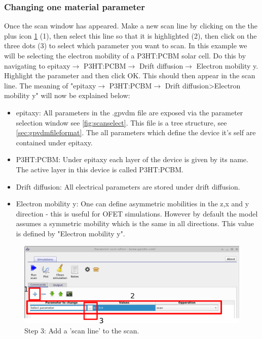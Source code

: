 \subsubsection{Changing one material parameter}

Once the scan window has appeared. Make a new scan line by clicking on the the plus icon \ref{fig:newscanline} (1), then select this line so that it is highlighted (2), then click on the three dots (3) to select which parameter you want to scan. In this example we will be selecting the electron mobility of a P3HT:PCBM solar cell. Do this by navigating to epitaxy$\rightarrow$ P3HT:PCBM$\rightarrow$ Drift diffusion$\rightarrow$ Electron mobility y. Highlight the parameter and then click OK. This should then appear in the scan line. The meaning of "epitaxy$\rightarrow$ P3HT:PCBM$\rightarrow$ Drift diffusion>Electron mobility y" will now be explained below:

\begin{itemize}
  \item epitaxy: All parameters in the .gpvdm file are exposed via the parameter selection window see \ref{fig:scanselect}. This file is a tree structure, see \ref{sec:gpvdmfileformat}. The all parameters which define the device it's self are contained under epitaxy.
  \item P3HT:PCBM: Under epitaxy each layer of the device is given by its name. The active layer in this device is called P3HT:PCBM.
  \item Drift diffusion: All electrical parameters are stored under drift diffusion.
  \item Electron mobility y: One can define asymmetric mobilities in the z,x and y direction - this is useful for OFET simulations.  However by default the model assumes a symmetric mobility which is the same in all directions. This value is defined by "Electron mobility y". 
\end{itemize}

\begin{figure}[H]
\centering
\includegraphics[width=\textwidth]{./images/param_scan_new_line.png}
\caption{Step 3: Add a 'scan line' to the scan.}
\label{fig:newscanline}
\end{figure}

